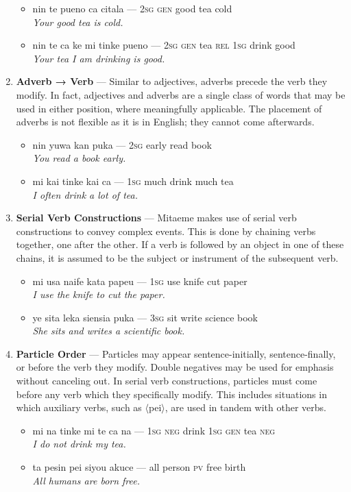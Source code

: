 \documentclass[a4paper, titlepage]{article}
\begin{document}
\begin{enumerate}
	\begin{itemize}
		\item nin te pueno ca citala — \textsc{2sg} \textsc{gen} good tea cold\\\textit{Your good tea is cold.}
		\item nin te ca ke mi tinke pueno — \textsc{2sg gen} tea \textsc{rel 1sg} drink good\\\textit{Your tea I am drinking is good.}
	\end{itemize}
	\item \textbf{Adverb → Verb} — Similar to adjectives, adverbs precede the verb they modify. In fact, adjectives and adverbs are a single class of words that may be used in either position, where meaningfully applicable. The placement of adverbs is not flexible as it is in English; they cannot come afterwards.
	\begin{itemize}
		\item nin yuwa kan puka — \textsc{2sg} early read book\\\textit{You read a book early.}
		\item mi kai tinke kai ca — \textsc{1sg} much drink much tea\\\textit{I often drink a lot of tea.}
	\end{itemize}
	\item \textbf{Serial Verb Constructions} — Mitaeme makes use of serial verb constructions to convey complex events. This is done by chaining verbs together, one after the other. If a verb is followed by an object in one of these chains, it is assumed to be the subject or instrument of the subsequent verb.
	\begin{itemize}
		\item mi usa naife kata papeu — \textsc{1sg} use knife cut paper\\\textit{I use the knife to cut the paper.}
		\item ye sita leka siensia puka — \textsc{3sg} sit write science book\\\textit{She sits and writes a scientific book.}
	\end{itemize}
	\item \textbf{Particle Order} — Particles may appear sentence-initially, sentence-finally, or before the verb they modify. Double negatives may be used for emphasis without canceling out. In serial verb constructions, particles must come before any verb which they specifically modify. This includes situations in which auxiliary verbs, such as $\langle$pei$\rangle$, are used in tandem with other verbs.
	\begin{itemize}
		\item mi na tinke mi te ca na — \textsc{1sg} \textsc{neg} drink \textsc{1sg} \textsc{gen} tea \textsc{neg}\\\textit{I do not drink my tea.}
		\item ta pesin pei siyou akuce — all person \textsc{pv} free birth\\\textit{All humans are born free.}
	\end{itemize}
\end{enumerate}
\end{document}
